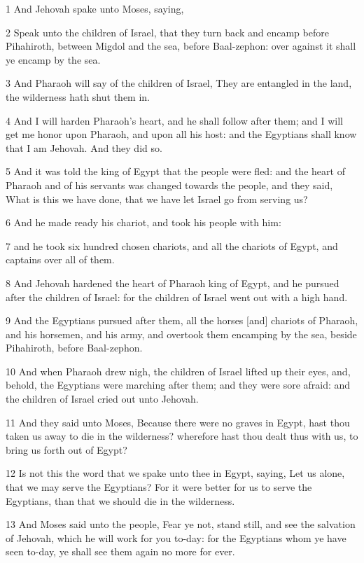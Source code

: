 \par 1 And Jehovah spake unto Moses, saying,
\par 2 Speak unto the children of Israel, that they turn back and encamp before Pihahiroth, between Migdol and the sea, before Baal-zephon: over against it shall ye encamp by the sea.
\par 3 And Pharaoh will say of the children of Israel, They are entangled in the land, the wilderness hath shut them in.
\par 4 And I will harden Pharaoh's heart, and he shall follow after them; and I will get me honor upon Pharaoh, and upon all his host: and the Egyptians shall know that I am Jehovah. And they did so.
\par 5 And it was told the king of Egypt that the people were fled: and the heart of Pharaoh and of his servants was changed towards the people, and they said, What is this we have done, that we have let Israel go from serving us?
\par 6 And he made ready his chariot, and took his people with him:
\par 7 and he took six hundred chosen chariots, and all the chariots of Egypt, and captains over all of them.
\par 8 And Jehovah hardened the heart of Pharaoh king of Egypt, and he pursued after the children of Israel: for the children of Israel went out with a high hand.
\par 9 And the Egyptians pursued after them, all the horses [and] chariots of Pharaoh, and his horsemen, and his army, and overtook them encamping by the sea, beside Pihahiroth, before Baal-zephon.
\par 10 And when Pharaoh drew nigh, the children of Israel lifted up their eyes, and, behold, the Egyptians were marching after them; and they were sore afraid: and the children of Israel cried out unto Jehovah.
\par 11 And they said unto Moses, Because there were no graves in Egypt, hast thou taken us away to die in the wilderness? wherefore hast thou dealt thus with us, to bring us forth out of Egypt?
\par 12 Is not this the word that we spake unto thee in Egypt, saying, Let us alone, that we may serve the Egyptians? For it were better for us to serve the Egyptians, than that we should die in the wilderness.
\par 13 And Moses said unto the people, Fear ye not, stand still, and see the salvation of Jehovah, which he will work for you to-day: for the Egyptians whom ye have seen to-day, ye shall see them again no more for ever.
